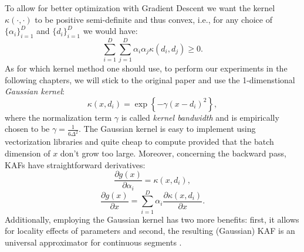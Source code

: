 \documentclass[LaM,binding=0.6cm]{./packages/sapthesis/sapthesis}
\begin{document}
    To allow for better optimization with Gradient Descent we want the kernel $\kappa(\cdot, \cdot)$ to be positive semi-definite and thus convex, i.e., for any choice of 
    $\{ \alpha_i\}_{i=1}^D $ and $\{ d_i\}_{i=1}^D $ we would have:
    \begin{equation}
        \sum_{i=1}^{D} \sum_{j=1}^{D} \alpha_{i} \alpha_{j} \kappa\left(d_{i}, d_{j}\right) \geq 0 .
    \end{equation}
    As for which kernel method one should use, to perform our experiments in the following chapters, we will stick to the original paper and use the 1-dimenstional \textit{Gaussian kernel}:
    \begin{equation}
        \label{gauskaf}
        \kappa\left(x, d_{i}\right)=\exp \left\{-\gamma\left(x-d_{i}\right)^{2}\right\},
    \end{equation}
    where the normalization term $\gamma$ is called \textit{kernel bandwidth} and is empirically chosen to be $ \gamma = \frac{1}{6  \Delta^2} $.
    The Gaussian kernel is easy to implement using vectorization libraries and quite cheap to compute provided that the batch dimension of $x$ don't grow too large. Moreover, 
    concerning the backward pass, KAFs have straightforward derivatives:
    \begin{equation}
        \frac{\partial g(x)}{\partial \alpha_{i}}=\kappa\left(x, d_{i}\right),
    \end{equation}
    \begin{equation}
        \frac{\partial g(x)}{\partial x}=\sum_{i=1}^{D} \alpha_{i} \frac{\partial \kappa\left(x, d_{i}\right)}{\partial x}.
    \end{equation}
    Additionally, employing the Gaussian kernel has two more benefits: first, it allows for locality effects of parameters and second, the resulting (Gaussian) KAF
    is an universal approximator for continuous segments \cite{micchelli2006universal}.
\end{document}
